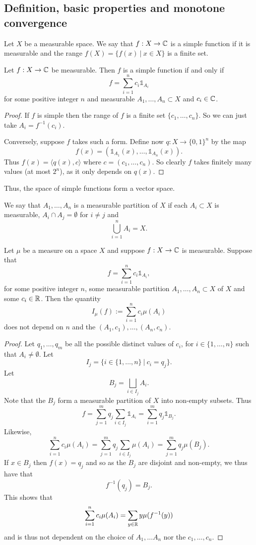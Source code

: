 \documentclass[twoside, a4paper, 10pt]{amsart}
\begin{document}
\subsection{Definition, basic properties and monotone convergence}
\begin{mydef} Let $X$ be a measurable space. We say that $f:X \to \mathbb{C}$ is a simple function if it is measurable and the range $f(X) = \{f(x) ~|~ x \in X\}$ is a finite set. \end{mydef}

\begin{lemma} Let $f:X \to \mathbb{C}$ be measurable. Then $f$ is a simple function if and only if $$f = \sum_{i=1}^n c_i \mathds{1}_{A_i}$$ for some positive integer $n$ and measurable $A_1, \ldots, A_n \subset X$ and $c_i \in \mathbb{C}$.
\end{lemma}

\begin{proof} If $f$ is simple then the range of $f$ is a finite set $\{c_1, \ldots, c_n\}$. So we can just take $A_i = f^{-1}(c_i)$. 

Conversely, suppose $f$ takes such a form. Define now $q:X \to \{0,1\}^n$ by the map $$f(x) = (\mathds{1}_{A_1}(x), \ldots, \mathds{1}_{A_n}(x)).$$ Thus $f(x) = \langle q(x), c \rangle$ where $c = (c_1, \ldots, c_n)$. So clearly $f$ takes finitely many values (at most $2^n$), as it only depends on $q(x)$. \end{proof}

Thus, the space of simple functions form a vector space.

We say that $A_1, \ldots, A_n$ is a measurable partition of $X$ if each $A_i \subset X$ is measurable, $A_i \cap A_j = \emptyset$ for $i \neq j$ and $$\bigcup_{i=1}^n A_i = X.$$

\begin{lemma}\label{lemma: simple func int partition} Let $\mu$ be a measure on a space $X$ and suppose $f:X \to \mathbb{C}$ is measurable. Suppose that $$f = \sum_{i=1}^n c_i\mathds{1}_{A_i},$$ for some positive integer $n$, some measurable partition $A_1, \ldots, A_n \subset X$ of $X$ and some $c_i \in \mathbb{R}$. Then the quantity $$I_{\mu}(f) := \sum_{i=1}^n c_i \mu(A_i)$$ does not depend on $n$ and the $(A_1,c_1), \ldots, (A_n, c_n)$.

\end{lemma}

\begin{proof} Let $q_1, \ldots, q_m$ be all the possible distinct values of $c_i$, for $i \in \{1, \ldots, n\}$ such that $A_i \neq \emptyset$. Let $$I_j = \{ i \in \{1, \ldots, n\} ~|~ c_i = q_j \}.$$ Let $$B_j = \bigsqcup_{i \in I_j} A_i.$$ Note that the $B_j$ form a measurable partition of $X$ into non-empty subsets. Thus $$f = \sum_{j=1}^m q_j \sum_{i \in I_j} \mathds{1}_{A_i} = \sum_{i=1}^m q_j \mathds{1}_{B_j}. $$ Likewise, $$\sum_{i=1}^n c_i \mu(A_i) = \sum_{j=1}^m q_j \sum_{i \in I_j} \mu(A_i) = \sum_{j=1}^m q_j \mu(B_j).$$ If $x \in B_j$ then $f(x) = q_j$ and so as the $B_j$ are disjoint and non-empty, we thus have that $$f^{-1}(q_j) = B_j.$$ This shows that $$\sum_{i=1}^n c_i \mu(A_i) = \sum_{y \in \mathbb{R}} y \mu(f^{-1}(y))$$ and is thus not dependent on the choice of $A_1, \ldots A_n$ nor the $c_1, \ldots, c_n$. \end{proof}
\end{document}
